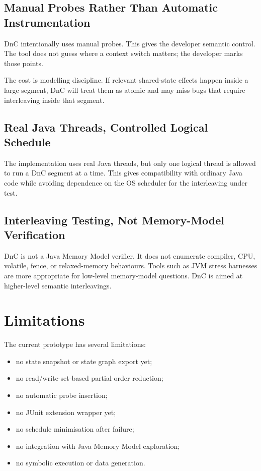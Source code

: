 \documentclass[11pt]{article}
\begin{document}
\subsection{Manual Probes Rather Than Automatic Instrumentation}

DnC intentionally uses manual probes. This gives the developer semantic control. The tool does not guess where a context switch matters; the developer marks those points.

The cost is modelling discipline. If relevant shared-state effects happen inside a large segment, DnC will treat them as atomic and may miss bugs that require interleaving inside that segment.

\subsection{Real Java Threads, Controlled Logical Schedule}

The implementation uses real Java threads, but only one logical thread is allowed to run a DnC segment at a time. This gives compatibility with ordinary Java code while avoiding dependence on the OS scheduler for the interleaving under test.

\subsection{Interleaving Testing, Not Memory-Model Verification}

DnC is not a Java Memory Model verifier. It does not enumerate compiler, CPU, volatile, fence, or relaxed-memory behaviours. Tools such as JVM stress harnesses are more appropriate for low-level memory-model questions. DnC is aimed at higher-level semantic interleavings.

\section{Limitations}

The current prototype has several limitations:

\begin{itemize}[nosep]
  \item no state snapshot or state graph export yet;
  \item no read/write-set-based partial-order reduction;
  \item no automatic probe insertion;
  \item no JUnit extension wrapper yet;
  \item no schedule minimisation after failure;
  \item no integration with Java Memory Model exploration;
  \item no symbolic execution or data generation.
\end{itemize}
\end{document}
